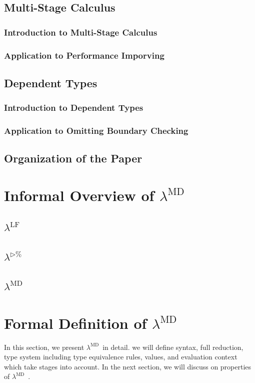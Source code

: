 \documentclass[runningheads]{llncs}
\newcommand{\LTP}{$\lambda^{\triangleright\%}$\ }
\newcommand{\LMD}{$\lambda^{\textrm{MD}}$\ }
\newcommand{\LLF}{$\lambda^{\textrm{LF}}$\ }
\begin{document}
\subsection{Multi-Stage Calculus}
\subsubsection{Introduction to Multi-Stage Calculus}
\subsubsection{Application to Performance Imporving}
\subsection{Dependent Types}
\subsubsection{Introduction to Dependent Types}
\subsubsection{Application to Omitting Boundary Checking}
\subsection{Organization of the Paper}

\section{Informal Overview of \LMD}
\subsection{\LLF}
\subsection{\LTP}
\subsection{\LMD}

\section{Formal Definition of \LMD}

In this section, we present \LMD in detail. we will define syntax, full reduction, type system including type equivalence rules, values, and evaluation context which take stages into account.
In the next section, we will discuss on properties of \LMD.
\end{document}
